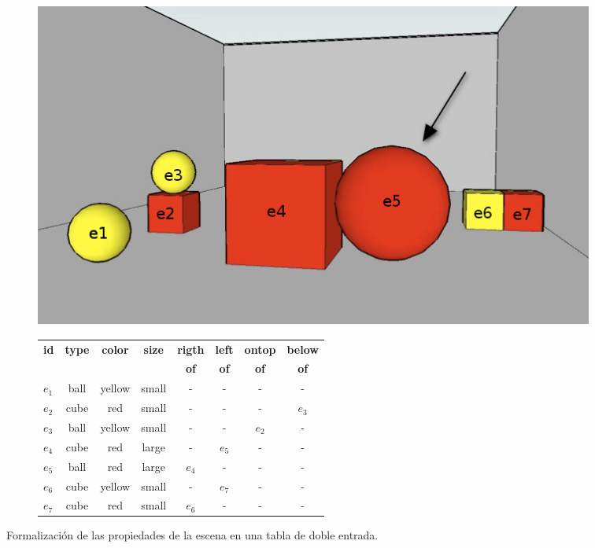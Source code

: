\begin{figure}[H]
\begin{subfigure}{.45\textwidth}
  \centering
	\vspace*{-.2cm}
\includegraphics[width=\textwidth]{images/22.jpg}
  \caption{}\label{GRE3D7-stimulus1-ids}
\end{subfigure}
\begin{subfigure}{1\textwidth}
\hspace*{-16cm}
\begin{scriptsize}
\begin{tabular}{|l|c|c|c|c|c|c|c|}
\hline
\textbf {id}& 	\textbf {type}		&	\textbf {color}	&	\textbf {size}& \textbf {rigth} & \textbf {left} & \textbf {ontop}	& \textbf {below}	\\
   	   &  	    			&	    		&	     		&  \textbf {of}   		 &  \textbf {of}	    &  \textbf {of}	&  \textbf {of}\\
\hline \hline
$e_1$ & ball & yellow & small & - & - & - & - \\
$e_2$ & cube & red & small & - & - &- & $e_3$ \\
$e_3$ & ball & yellow & small & - & - & $e_2$ & -\\
$e_4$ & cube & red & large & - & $e_5$ & - & -\\
$e_5$ & ball & red & large & $e_4$ & - & - & -\\
$e_6$ & cube & yellow & small & - & $e_7$ & - & -\\
$e_7$ & cube & red & small & $e_6$ & - & - & -\\
\hline

\end{tabular}
\end{scriptsize}
\vspace*{1cm}
\centering \hspace*{-8cm} \caption{}\label{tabla-propiedades}
\end{subfigure}
\caption{Formalizaci\'on de las propiedades de la escena en una tabla de doble entrada.}\label{contexto-tabla-propiedades}
\end{figure}

